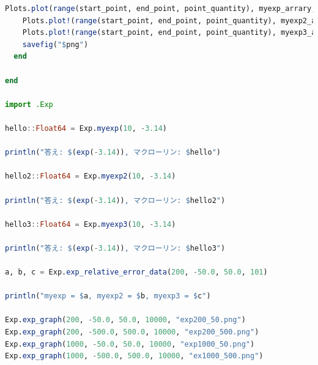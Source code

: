 \documentclass[uplatex, dvipdfmx, a4j,11pt]{jsarticle}
\begin{document}
\begin{lstlisting}[title={課題4}, label=code:in, language=Julia]
    Plots.plot(range(start_point, end_point, point_quantity), myexp_arrary, ylim=[10^(-20), 1.0], yaxis=:log)
    Plots.plot!(range(start_point, end_point, point_quantity), myexp2_arrary, ylim=[10^(-20), 1.0], yaxis=:log)
    Plots.plot!(range(start_point, end_point, point_quantity), myexp3_arrary, ylim=[10^(-20), 1.0], yaxis=:log)
    savefig("$png")
  end

end

import .Exp

hello::Float64 = Exp.myexp(10, -3.14)

println("答え: $(exp(-3.14)), マクローリン: $hello")

hello2::Float64 = Exp.myexp2(10, -3.14)

println("答え: $(exp(-3.14)), マクローリン: $hello2")

hello3::Float64 = Exp.myexp3(10, -3.14)

println("答え: $(exp(-3.14)), マクローリン: $hello3")

a, b, c = Exp.exp_relative_error_data(200, -50.0, 50.0, 101)

println("myexp = $a, myexp2 = $b, myexp3 = $c")

Exp.exp_graph(200, -50.0, 50.0, 10000, "exp200_50.png")
Exp.exp_graph(200, -500.0, 500.0, 10000, "exp200_500.png")
Exp.exp_graph(1000, -50.0, 50.0, 10000, "exp1000_50.png")
Exp.exp_graph(1000, -500.0, 500.0, 10000, "ex1000_500.png")

\end{lstlisting}
\end{document}

